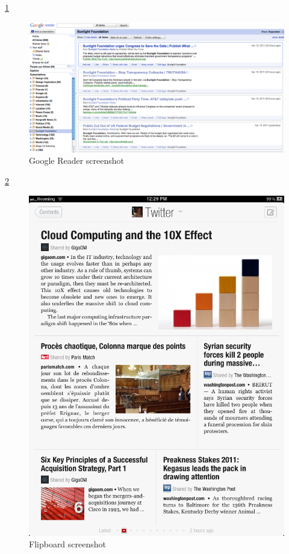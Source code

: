 \documentclass{acm_proc_10ptArticle-sp}
\begin{document}
\ref{screenshot:reader}
\begin{figure}[H]
  \centering
  \includegraphics[width=0.9\linewidth]{img/Google-Reader.png}
  \caption{Google Reader screenshot}
  \label{screenshot:reader}
\end{figure}

\ref{screenshot:flipboard}
\begin{figure}[H]
  \centering
  \includegraphics[width=0.9\linewidth]{img/flipboard-screenshot.png}
  \caption{Flipboard screenshot}
  \label{screenshot:flipboard}
\end{figure}
\end{document}
